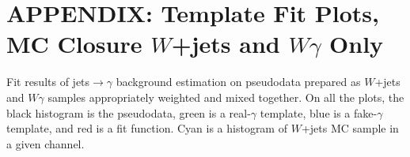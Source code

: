 \section{APPENDIX:  Template Fit Plots, MC Closure $W$+jets and $W\gamma$ Only}
\label{sec:TemplateFitPlotsMCclosureWjetsPlusWg}

Fit results of jets$ \rightarrow \gamma$ background estimation on pseudodata prepared as $W$+jets and $W\gamma$ samples appropriately weighted and mixed together. On all the plots, the black histogram is the pseudodata, green is a real-$\gamma$ template, blue is a fake-$\gamma$ template, and red is a fit function. Cyan is a histogram of $W$+jets MC sample in a given channel. 

